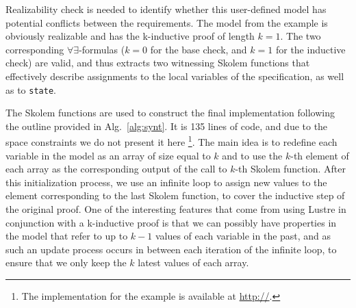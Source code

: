 
Realizability check is needed to identify whether this user-defined model
 has potential conflicts between the requirements.
The model from the example is obviously realizable and has
the k-inductive proof of length $k = 1$.
The two corresponding $\forall\exists$-formulas ($k=0$ for
the base check, and $k=1$ for the inductive check) are valid, and thus  \aeval
extracts two witnessing Skolem functions
that effectively describe
 assignments to the local variables of the specification, as well as to \texttt{state}.

The Skolem functions are used to construct the final implementation
following the outline provided in Alg.~\ref{alg:synt}. 
It is 135 lines of code, and due to the space constraints we do not
present it here%
\footnote{The implementation for the
example is available at \url{http://}.}.
The main idea is to redefine each variable in the model 
as an array of size equal to $k$ and
to use the $k$-th element of each array as the corresponding output of the call
to $k$-th Skolem function. After this initialization process, we use an infinite
loop to assign new values to the element corresponding to the last Skolem
function, to cover the inductive step of the original proof. 
One of the
interesting features that come from using Lustre in conjunction with a
k-inductive proof is that we can possibly have properties in the model that
refer to up to $k-1$ values of each variable in the past, and as such an update
process occurs in between each iteration of the infinite loop, to ensure that we
only keep the $k$ latest values of each array.
